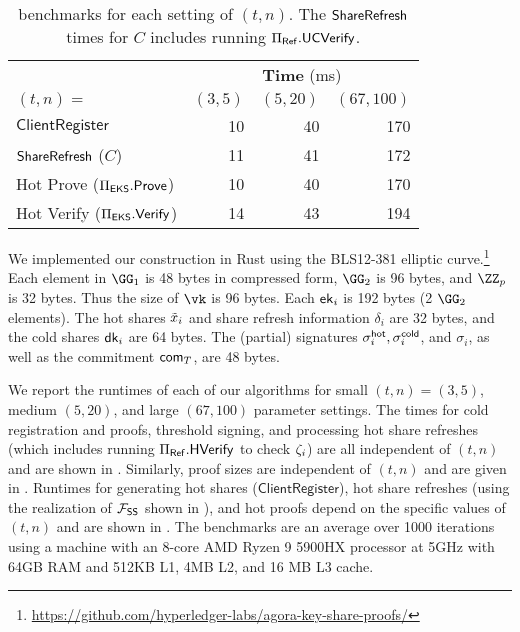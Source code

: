 \begin{table}[tb]
    \centering
    \begin{tabular}{l rrr}
        \toprule
        & \multicolumn{3}{c}{\textbf{Time} (ms)} \\
        $(t,n)=$                  & $(3,5)$ & $(5,20)$ & $(67,100)$ \\\midrule
        $\mathsf{ClientRegister}$ & 10      & 40       & 170 \\
        $\mathsf{ShareRefresh}$ ($C$)            & 11      & 41       & 172 \\
        Hot Prove ($\Pi_{\sf EKS}.\mathsf{Prove}$) & 10 & 40 & 170 \\
        Hot Verify ($\Pi_{\sf EKS}.{\mathsf{Verify}}$) & 14 & 43 & 194     \\\bottomrule
    \end{tabular}
    \caption{\sysname benchmarks for each setting of $(t,n)$. The $\mathsf{ShareRefresh}$ times for $C$ includes running $\Pi_{\sf Ref}.{\sf UC}{\mathsf{Verify}}$.}
    \label{tab:thresh_bench}
\end{table}

We implemented our construction in Rust using the BLS12-381 elliptic curve.\footnote{\url{https://github.com/hyperledger-labs/agora-key-share-proofs/}}
Each element in $\GG_1$ is 48 bytes in compressed form, $\GG_2$ is 96 bytes, and $\ZZ_p$ is 32 bytes. Thus the size of $\vk$ is 96 bytes. Each $\mathsf{ek}_i$ is 192 bytes (2 $\GG_2$ elements). The hot shares $\tilde{x}_i$ and share refresh information $\delta_i$ are 32 bytes, and the cold shares $\mathsf{dk}_i$ are 64 bytes. The (partial) signatures $\sigma_i^{\mathsf{hot}}, \sigma_i^{\mathsf{cold}}$, and $\sigma_i$, as well as the commitment $\mathsf{com}_{T}$, are 48 bytes. %

We report the runtimes of each of our algorithms for small $(t,n)=(3,5)$, %
medium $(5,20)$, %
and large $(67,100)$ parameter settings. %
The times for cold registration and proofs, threshold signing, and processing hot share refreshes (which includes running $\Pi_{\sf Ref}.{\sf H}{\mathsf{Verify}}$ to check $\zeta_i$) are all independent of $(t,n)$ and are shown in . Similarly, proof sizes are independent of $(t,n)$ and are given in . Runtimes for generating hot shares ($\mathsf{ClientRegister}$), hot share refreshes (using the realization of $\mathcal{F}_\mathsf{SS}$ shown in ), and hot proofs depend on the specific values of $(t,n)$ and are shown in .
The benchmarks are an average over 1000 iterations using a machine with an 8-core AMD Ryzen 9 5900HX processor at 5GHz with 64GB RAM and 512KB L1, 4MB L2, and 16 MB L3 cache.